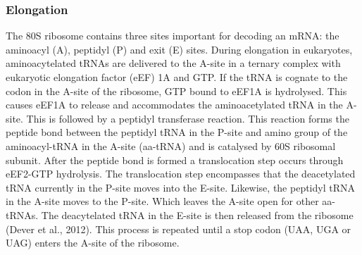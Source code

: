 \documentclass[
  12pt,
  openany]{book}
\begin{document}
\subsubsection{Elongation} \label{elongation}

The 80S ribosome contains three sites important for decoding an mRNA: the aminoacyl (A), peptidyl (P) and exit (E) sites. During elongation in eukaryotes, aminoacytelated tRNAs are delivered to the A-site in a ternary complex with eukaryotic elongation factor (eEF) 1A and GTP. If the tRNA is cognate to the codon in the A-site of the ribosome, GTP bound to eEF1A is hydrolysed. This causes eEF1A to release and accommodates the aminoacetylated tRNA in the A-site. This is followed by a peptidyl transferase reaction. This reaction forms the peptide bond between the peptidyl tRNA in the P-site and amino group of the aminoacyl-tRNA in the A-site (aa-tRNA) and is catalysed by 60S ribosomal subunit. After the peptide bond is formed a translocation step occurs through eEF2-GTP hydrolysis. The translocation step encompasses that the deacetylated tRNA currently in the P-site moves into the E-site. Likewise, the peptidyl tRNA in the A-site moves to the P-site. Which leaves the A-site open for other aa-tRNAs. The deacytelated tRNA in the E-site is then released from the ribosome (Dever et al., 2012). This process is repeated until a stop codon (UAA, UGA or UAG) enters the A-site of the ribosome.
\end{document}
